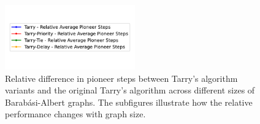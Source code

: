 \begin{figure}[H]
    \centering
    \qquad
    \qquad
    \includegraphics[width=0.5\textwidth]{Cap3/tarry_var_steps_legend_relative.pdf}
    \newline
    \qquad 
    \newline
    \qquad
    \caption{Relative difference in pioneer steps between Tarry's algorithm variants and the original Tarry's algorithm across different sizes of Barabási-Albert graphs. The subfigures illustrate how the relative performance changes with graph size.} 
    \label{fig_tarry_steps_relative_all_sizes_barabasi}
\end{figure}

